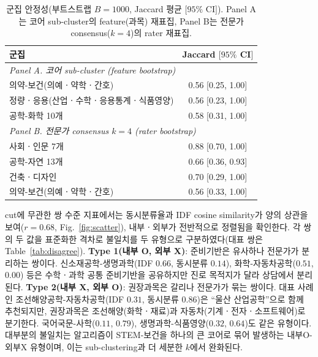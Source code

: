 \documentclass[conference]{IEEEtran}
\begin{document}
\begin{table}[!ht]
\centering
\caption{군집 안정성(부트스트랩 $B=1000$, Jaccard 평균 $[95\%$ CI$]$). Panel A는 코어 sub-cluster의 feature(과목) 재표집, Panel B는 전문가 consensus($k=4$)의 rater 재표집.}
\label{tab:stability}
\begin{tabular}{lc}
\hline
군집 & Jaccard $[95\%$ CI$]$ \\
\hline
\multicolumn{2}{l}{\emph{Panel A. 코어 sub-cluster (feature bootstrap)}} \\
의약-보건(의예ㆍ약학ㆍ간호) & 0.56 [0.25, 1.00] \\
정량ㆍ응용(산업ㆍ수학ㆍ응용통계ㆍ식품영양) & 0.56 [0.23, 1.00] \\
공학-화학 10개 & 0.58 [0.31, 1.00] \\
\hline
\multicolumn{2}{l}{\emph{Panel B. 전문가 consensus $k=4$ (rater bootstrap)}} \\
사회ㆍ인문 7개 & 0.88 [0.70, 1.00] \\
공학-자연 13개 & 0.66 [0.36, 0.93] \\
건축ㆍ디자인 & 0.70 [0.29, 1.00] \\
의약-보건(의예ㆍ약학ㆍ간호) & 0.56 [0.33, 1.00] \\
\hline
\end{tabular}
\end{table}

cut에 무관한 쌍 수준 지표에서는 동시분류율과 IDF cosine similarity가 양의 상관을 보여($r=0.68$, Fig.~\ref{fig:scatter}), 내부ㆍ외부가 전반적으로 정렬됨을 확인한다.
각 쌍의 두 값을 표준화한 격차로 불일치를 두 유형으로 구분하였다(대표 쌍은 Table~\ref{tab:disagree}).
\textbf{Type 1(내부 O, 외부 X)}: 준비기반은 유사하나 전문가가 분리하는 쌍이다.
신소재공학-생명과학(IDF $0.66$, 동시분류 $0.14$), 화학-자동차공학($0.51$, $0.00$) 등은 수학ㆍ과학 공통 준비기반을 공유하지만 진로 목적지가 달라 상담에서 분리된다.
\textbf{Type 2(내부 X, 외부 O)}: 권장과목은 갈리나 전문가가 묶는 쌍이다.
대표 사례인 조선해양공학-자동차공학(IDF $0.31$, 동시분류 $0.86$)은 ``울산 산업공학''으로 함께 추천되지만, 권장과목은 조선해양(화학ㆍ재료)과 자동차(기계ㆍ전자ㆍ소프트웨어)로 분기한다.
국어국문-사학($0.11$, $0.79$), 생명과학-식품영양($0.32$, $0.64$)도 같은 유형이다.
대부분의 불일치는 알고리즘이 STEM-보건을 하나의 큰 코어로 묶어 발생하는 내부O-외부X 유형이며, 이는 sub-clustering과 더 세분한 $k$에서 완화된다.
\end{document}
